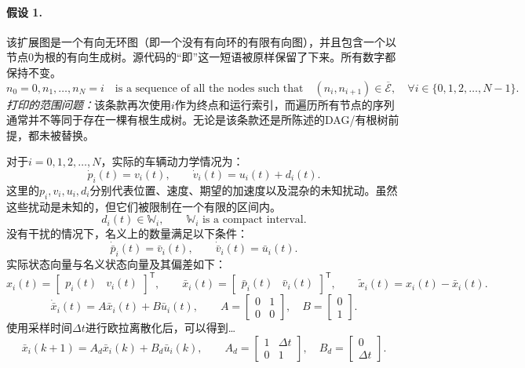 \documentclass{article}
\begin{document}
\paragraph{假设 1.}
该扩展图是一个有向无环图（即一个没有有向环的有限有向图），并且包含一个以节点$0$为根的有向生成树。源代码的“即”这一短语被原样保留了下来。所有数字都保持不变。
\[
n_0=0,n_1,\ldots,n_N=i
\quad\text{is a sequence of all the nodes such that}\quad
(n_i,n_{i+1})\in\overline{\mathscr E},
\quad\forall i\in\{0,1,2,\ldots,N-1\}.
\]
\emph{打印的范围问题：}该条款再次使用$i$作为终点和运行索引，而遍历所有节点的序列通常并不等同于存在一棵有根生成树。无论是该条款还是所陈述的DAG/有根树前提，都未被替换。

对于$i=0,1,2,\ldots,N$，实际的车辆动力学情况为：
\begin{equation}
\dot p_i(t)=v_i(t),\qquad
\dot v_i(t)=u_i(t)+d_i(t).
\tag{1}
\end{equation}
这里的$p_i,v_i,u_i,d_i$分别代表位置、速度、期望的加速度以及混杂的未知扰动。虽然这些扰动是未知的，但它们被限制在一个有限的区间内。
\[
d_i(t)\in\mathbb W_i,\qquad \mathbb W_i\text{ is a compact interval}.
\]
没有干扰的情况下，名义上的数量满足以下条件：
\begin{equation}
\dot{\bar p}_i(t)=\bar v_i(t),\qquad
\dot{\bar v}_i(t)=\bar u_i(t).
\tag{2}
\end{equation}
实际状态向量与名义状态向量及其偏差如下：
\[
x_i(t)=\begin{bmatrix}p_i(t)&v_i(t)\end{bmatrix}^{\mathsf T},\qquad
\bar x_i(t)=\begin{bmatrix}\bar p_i(t)&\bar v_i(t)\end{bmatrix}^{\mathsf T},\qquad
\widetilde x_i(t)=x_i(t)-\bar x_i(t).
\]
\begin{equation}
\dot{\bar x}_i(t)=A\bar x_i(t)+B\bar u_i(t),\qquad
A=\begin{bmatrix}0&1\\0&0\end{bmatrix},\quad
B=\begin{bmatrix}0\\1\end{bmatrix}.
\tag{3}
\end{equation}
使用采样时间$\Delta t$进行欧拉离散化后，可以得到…
\begin{equation}
\bar x_i(k+1)=A_d\bar x_i(k)+B_d\bar u_i(k),\qquad
A_d=\begin{bmatrix}1&\Delta t\\0&1\end{bmatrix},\quad
B_d=\begin{bmatrix}0\\\Delta t\end{bmatrix}.
\tag{13}
\end{equation}
\end{document}
